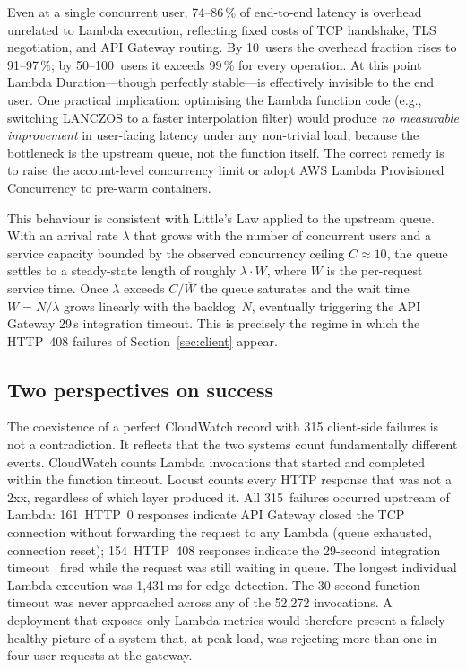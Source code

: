 \documentclass[10pt,twocolumn]{article}
\begin{document}
Even at a single concurrent user, 74--86\,\% of end-to-end latency is overhead
unrelated to Lambda execution, reflecting fixed costs of TCP handshake, TLS
negotiation, and API Gateway routing. By 10~users the overhead fraction rises to
91--97\,\%; by 50--100~users it exceeds 99\,\% for every operation. At this
point Lambda Duration---though perfectly stable---is effectively invisible to
the end user. One practical implication: optimising the Lambda
function code (e.g., switching LANCZOS to a faster interpolation filter) would
produce \textit{no measurable improvement} in user-facing latency under any
non-trivial load, because the bottleneck is the upstream queue, not the function
itself. The correct remedy is to raise the account-level concurrency limit or
adopt AWS Lambda Provisioned Concurrency to pre-warm containers.

This behaviour is consistent with Little's Law applied to the upstream queue.
With an arrival rate $\lambda$ that grows with the number of concurrent users
and a service capacity bounded by the observed concurrency ceiling
$C \approx 10$, the queue settles to a steady-state length of roughly
$\lambda \cdot \overline{W}$, where $\overline{W}$ is the per-request service
time. Once $\lambda$ exceeds $C / \overline{W}$ the queue saturates and the
wait time $W = N / \lambda$ grows linearly with the backlog~$N$, eventually
triggering the API Gateway 29\,s integration timeout. This is precisely the
regime in which the HTTP~408 failures of Section~\ref{sec:client} appear.

\subsection{Two perspectives on success}

The coexistence of a perfect CloudWatch record with 315 client-side failures is
not a contradiction. It reflects that the two systems count fundamentally
different events. CloudWatch counts Lambda invocations that started and completed
within the function timeout. Locust counts every HTTP response that was not a
2xx, regardless of which layer produced it. All 315~failures occurred upstream
of Lambda: 161~HTTP~0 responses indicate API Gateway closed the TCP connection
without forwarding the request to any Lambda (queue exhausted, connection
reset); 154~HTTP~408 responses indicate the 29-second integration
timeout~\cite{aws:apigw-limits} fired while the request was still waiting in
queue. The longest individual Lambda execution was 1{,}431\,ms for edge
detection. The 30-second function timeout was never approached across any of
the 52{,}272 invocations. A deployment that exposes only Lambda metrics would
therefore present a falsely healthy picture of a system that, at peak load, was
rejecting more than one in four user requests at the gateway.
\end{document}
